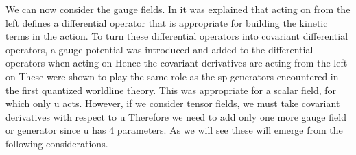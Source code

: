 \documentclass[a4paper,12pt]{article}
\begin{document}
We can now consider the gauge fields. In \cite{NCSp} it was explained that \coordHE{} acting on \myHighlight{$\varphi $}\coordHE{} from the left defines a differential operator
that is appropriate for building the kinetic terms in the action. To turn
these differential operators into covariant differential operators, a gauge
potential \coordHE{} was introduced and added to the
differential operators when acting on \coordHE{} Hence the covariant
derivatives are \coordHE{} acting from the left on \coordHE{} These \coordHE{} were
shown to play the same role as the sp\coordHE{} generators
encountered in the first quantized worldline theory. This was appropriate
for a scalar field, for which only u\myHighlight{$_{\star }\left( 1\right) $}\coordHE{} acts.
However, if we consider tensor fields, we must take covariant derivatives
with respect to u\coordHE{} Therefore we need to add
only one more gauge field or generator since u\coordHE{}
has 4 parameters. As we will see these will emerge from the following
considerations.
\end{document}
